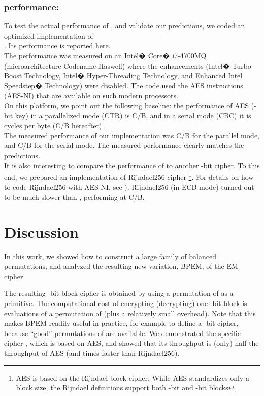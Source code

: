 \documentclass{llncs}
\begin{document}
\subsubsection{ performance:}
To test the actual performance of , and validate our predictions, we coded an optimized implementation of \\
. Its performance is reported here. \\
The performance was measured on an Intel� Core� i7-4700MQ (microarchitecture Codename Haswell) where the enhancements (Intel� Turbo Boost Technology, Intel� Hyper-Threading Technology, and Enhanced Intel Speedstep� Technology) were disabled. The code used the AES instructions (AES-NI) that are available on such modern processors. \\
On this platform, we point out the following baseline: the performance of AES (-bit key) in a parallelized mode (CTR) is  C/B, and in a serial mode (CBC) it is  cycles per byte (C/B hereafter). \\
The measured performance of our  implementation was  C/B for the parallel mode, and  C/B for the serial mode. The measured performance clearly matches the predictions. \\
It is also interesting to compare the performance of  to another -bit cipher. To this end, we prepared an implementation of Rijndael256 cipher \cite{Rijndael256}
\footnote[2]{AES is based on the Rijndael block cipher. While AES standardizes only a  block size, the Rijndael definitions support both -bit and -bit blocks}. For details on how to code Rijndael256 with AES-NI, see \cite{Gueron_WP}). Rijndael256 (in ECB mode) turned out to be much slower than , performing at  C/B.

\section{Discussion}\label{sec:discussion}

In this work, we showed how to construct a large family of balanced permutations, and analyzed the resulting new variation, BPEM, of the EM cipher. 

The resulting -bit block cipher is obtained by using a permutation of  as a primitive.
The computational cost of encrypting (decrypting) one -bit block is  evaluations of a permutation of  (plus a relatively small overhead).
Note that this makes BPEM readily useful in practice, for example to define a -bit cipher, because ``good'' permutations of  are available. We demonstrated the specific cipher , which is based on AES, and showed that its throughput is (only) half the throughput of AES (and  times faster than Rijndael256).
\end{document}
